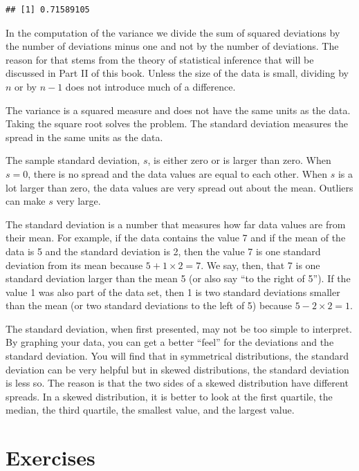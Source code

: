 \documentclass[]{krantz}
\theoremstyle{definition}
\theoremstyle{definition}
\theoremstyle{definition}
\theoremstyle{remark}
\begin{document}
\begin{verbatim}
## [1] 0.71589105
\end{verbatim}

In the computation of the variance we divide the sum of squared
deviations by the number of deviations minus one and not by the number
of deviations. The reason for that stems from the theory of statistical
inference that will be discussed in Part II of this book. Unless the
size of the data is small, dividing by \(n\) or by \(n-1\) does not
introduce much of a difference.

The variance is a squared measure and does not have the same units as
the data. Taking the square root solves the problem. The standard
deviation measures the spread in the same units as the data.

The sample standard deviation, \(s\), is either zero or is larger than
zero. When \(s=0\), there is no spread and the data values are equal to
each other. When \(s\) is a lot larger than zero, the data values are very
spread out about the mean. Outliers can make \(s\) very large.

The standard deviation is a number that measures how far data values are
from their mean. For example, if the data contains the value 7 and if
the mean of the data is 5 and the standard deviation is 2, then the
value 7 is one standard deviation from its mean because
\(5 + 1 \times 2 = 7\). We say, then, that 7 is one standard deviation
larger than the mean 5 (or also say ``to the right of 5''). If the value 1
was also part of the data set, then 1 is two standard deviations smaller
than the mean (or two standard deviations to the left of 5) because
\(5 - 2 \times 2 = 1\).

The standard deviation, when first presented, may not be too simple to
interpret. By graphing your data, you can get a better ``feel'' for the
deviations and the standard deviation. You will find that in symmetrical
distributions, the standard deviation can be very helpful but in skewed
distributions, the standard deviation is less so. The reason is that the
two sides of a skewed distribution have different spreads. In a skewed
distribution, it is better to look at the first quartile, the median,
the third quartile, the smallest value, and the largest value.

\hypertarget{exercises-2}{%
\section{Exercises}\label{exercises-2}}
\end{document}
